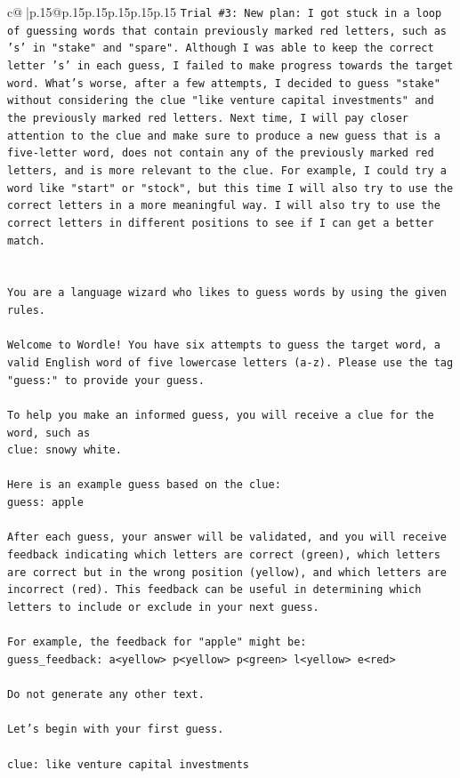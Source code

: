 \documentclass{article}
\begin{document}
{\begin{supertabular}{c@{$\;$}|p{.15\linewidth}@{}p{.15\linewidth}p{.15\linewidth}p{.15\linewidth}p{.15\linewidth}p{.15\linewidth}}
{{{\texttt{Trial \#3: New plan: I got stuck in a loop of guessing words that contain previously marked red letters, such as 's' in "stake" and "spare". Although I was able to keep the correct letter 's' in each guess, I failed to make progress towards the target word. What's worse, after a few attempts, I decided to guess "stake" without considering the clue "like venture capital investments" and the previously marked red letters. Next time, I will pay closer attention to the clue and make sure to produce a new guess that is a five{-}letter word, does not contain any of the previously marked red letters, and is more relevant to the clue. For example, I could try a word like "start" or "stock", but this time I will also try to use the correct letters in a more meaningful way. I will also try to use the correct letters in different positions to see if I can get a better match.} \\
\\ 
\\ 
\texttt{You are a language wizard who likes to guess words by using the given rules.} \\
\\ 
\texttt{Welcome to Wordle! You have six attempts to guess the target word, a valid English word of five lowercase letters (a{-}z). Please use the tag "guess:" to provide your guess.} \\
\\ 
\texttt{To help you make an informed guess, you will receive a clue for the word, such as} \\
\texttt{clue: snowy white.} \\
\\ 
\texttt{Here is an example guess based on the clue: } \\
\texttt{guess: apple} \\
\\ 
\texttt{After each guess, your answer will be validated, and you will receive feedback indicating which letters are correct (green), which letters are correct but in the wrong position (yellow), and which letters are incorrect (red). This feedback can be useful in determining which letters to include or exclude in your next guess.} \\
\\ 
\texttt{For example, the feedback for "apple" might be:} \\
\texttt{guess\_feedback: a<yellow> p<yellow> p<green> l<yellow> e<red>} \\
\\ 
\texttt{Do not generate any other text.} \\
\\ 
\texttt{Let's begin with your first guess.} \\
\\ 
\texttt{clue: like venture capital investments} \\
            }
        }
    }
     \\ \\


\end{supertabular}}
\end{document}
